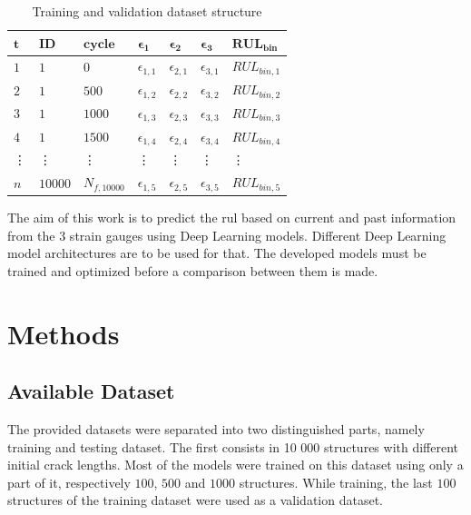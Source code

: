 \documentclass[conference]{IEEEtran}
\begin{document}
\begin{table}[htp]
	\centering
	\caption{Training and validation dataset structure}
	\label{tab:sliding_window_approach}
	\begin{tabular}{lllllll}
		$ \boldsymbol{t} $ & $ \boldsymbol{ID} $ & $ \boldsymbol{cycle} $ & $ \boldsymbol{\epsilon_1} $     & $ \boldsymbol{\epsilon_2} $     & $ \boldsymbol{\epsilon_3} $     & $ \boldsymbol{RUL_{bin}} $   \\
		\hline
		$ 1 $ & $ 1 $  & $ 0 $     & $ \epsilon_{1,1} $ & $ \epsilon_{2,1} $ &  $ \epsilon_{3,1} $ &  $ RUL_{bin,1} $ \\
		$ 2 $ & $ 1 $  & $ 500 $   & $ \epsilon_{1,2} $ & $ \epsilon_{2,2} $ & $ \epsilon_{3,2} $ & $ RUL_{bin,2} $ \\
		$ 3 $ & $ 1 $  & $ 1000 $  & $ \epsilon_{1,3} $ & $ \epsilon_{2,3} $ & $ \epsilon_{3,3} $ & $ RUL_{bin,3} $ \\
		$ 4 $ & $ 1 $  & $ 1500 $  & $ \epsilon_{1,4} $ & $ \epsilon_{2,4} $ & $ \epsilon_{3,4} $ & $ RUL_{bin,4} $ \\
		\vdots & \vdots & \vdots & \vdots & \vdots &\vdots & \vdots \\
		$ n $ & $ 10000 $  & $ N_{f,10000} $  & $ \epsilon_{1,5} $ & $ \epsilon_{2,5} $ & $ \epsilon_{3,5} $ & $ RUL_{bin,5} $
	\end{tabular}
\end{table}

The aim of this work is to predict the \gls{rul} based on current and past information from the 3 strain gauges using Deep Learning models. Different Deep Learning model architectures are to be used for that. The developed models must be trained and optimized before a comparison between them is made.

\section{Methods}
\label{sec:methods}

\subsection{Available Dataset}
\label{sec:available_dataset}

The provided datasets were separated into two distinguished parts, namely training and testing dataset. The first consists in 10 000 structures with different initial crack lengths. Most of the models were trained on this dataset using only a part of it, respectively $ 100 $, $ 500 $ and $ 1 000 $ structures. While training, the last $ 100 $ structures of the training dataset were used as a validation dataset.
\end{document}
